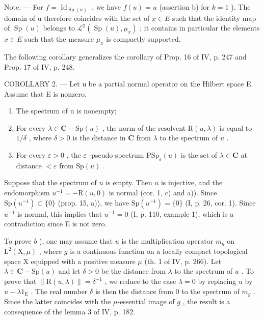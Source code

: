 Note. --- For \(f = \operatorname{Id}_{\operatorname{Sp}(u)}\) , we have \(f(u) = u\) (assertion b) for \(k = 1\) ). The domain of u therefore coincides with the set of \(x \in E\) such that the identity map of \(\operatorname{Sp}(u)\) belongs to \(\mathcal{L}^{2}(\operatorname{Sp}(u), \mu_{x})\) ; it contains in particular the elements \(x \in E\) such that the measure \(\mu_{x}\) is compactly supported.

The following corollary generalizes the corollary of Prop. 16 of IV, p. 247 and Prop. 17 of IV, p. 248.

COROLLARY 2. --- Let u be a partial normal operator on the Hilbert space E. Assume that E is nonzero.

\begin{enumerate}
\def\labelenumi{\alph{enumi})}
\item
  The spectrum of u is nonempty;
\item
  For every \(\lambda \in \mathbf{C} - \mathrm{Sp}(u)\) , the norm of the resolvent \(\mathrm{R}(u, \lambda)\) is equal to \(1/\delta\) , where \(\delta > 0\) is the distance in \(\mathbf{C}\) from \(\lambda\) to the spectrum of \(u\) .
\item
  For every \(\varepsilon > 0\) , the \(\varepsilon\) -pseudo-spectrum \(\mathrm{PSp}_{\varepsilon}(u)\) is the set of \(\lambda \in \mathbf{C}\) at distance \(< \varepsilon\) from \(\mathrm{Sp}(u)\) .
\end{enumerate}

Suppose that the spectrum of \(u\) is empty. Then \(u\) is injective, and the endomorphism \(u^{-1} = -\mathrm{R}(u,0)\) is normal (cor. 1, c) and a)). Since \(\mathrm{Sp}(u^{-1}) \subset \{0\}\) (prop. 15, a)), we have \(\mathrm{Sp}(u^{-1}) = \{0\}\) (I, p. 26, cor. 1). Since \(u^{-1}\) is normal, this implies that \(u^{-1} = 0\) (I, p. 110, example 1), which is a contradiction since E is not zero.

To prove \(b\) ), one may assume that \(u\) is the multiplication operator \(m_g\) on \(\mathrm{L}^2 (\mathrm{X},\mu)\) , where \(g\) is a continuous function on a locally compact topological space X equipped with a positive measure \(\mu\) (th. 1 of IV, p. 266). Let \(\lambda \in \mathbf{C} - \mathrm{Sp}(u)\) and let \(\delta >0\) be the distance from \(\lambda\) to the spectrum of \(u\) . To prove that \(\| \mathrm{R}(u,\lambda)\| = \delta^{-1}\) , we reduce to the case \(\lambda = 0\) by replacing \(u\) by \(u - \lambda 1_{\mathrm{E}}\) . The real number \(\delta\) is then the distance from 0 to the spectrum of \(m_g\) . Since the latter coincides with the \(\mu\)-essential image of \(g\) , the result is a consequence of the lemma 3 of IV, p. 182.

